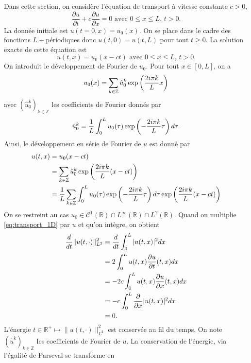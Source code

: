 Dans cette section, on considère l'équation de transport à vitesse constante $c>0$,
\begin{equation}
\dfrac{\partial u}{\partial t} + c \dfrac{\partial u}{\partial x} = 0 \text{ avec } 0 \leq x \leq L \text{, } t>0.
\label{eq:transport_1D}
\end{equation}
La donnée initiale est $u(t=0,x)=u_0(x)$. On se place dans le cadre des fonctions $L-$périodiques donc $u(t,0)=u(t,L)$ pour tout $t \geq 0$. La solution exacte de cette équation est
\begin{equation}
u(t,x) = u_0(x-ct)  \text{ avec } 0 \leq x \leq L \text{, } t>0.
\end{equation}
On introduit le développement de Fourier de $u_0$. Pour tout $x \in [0,L]$, on a
\begin{equation}
u_0(x) = \displaystyle\sum\limits_{k \in \mathbb{Z}} \hat{u}_0^k \exp \left( \dfrac{2i \pi k}{L} x \right)
\end{equation}
avec $(\hat{u}_0^k)_{k \in \mathbb{Z}}$ les coefficients de Fourier donnés par
\begin{equation}
\hat{u}_0^k = \dfrac{1}{L} \displaystyle\int_0^L u_0(\tau)  \exp \left( -\dfrac{2i \pi k}{L} \tau \right) d \tau.
\end{equation}
Ainsi, le développement en série de Fourier de $u$ est donné par
\begin{align}
u(t,x) & = u_0(x-ct)\\
	& = \displaystyle\sum\limits_{k \in \mathbb{Z}} \hat{u}_0^k \exp \left( \dfrac{2i \pi k}{L} (x-ct) \right) \\
	& = \dfrac{1}{L} \displaystyle\sum\limits_{k \in \mathbb{Z}} \displaystyle\int_0^L u_0(\tau)  \exp \left( -\dfrac{2i \pi k}{L} \tau \right) d \tau \exp \left( \dfrac{2i \pi k}{L} (x-ct) \right)
	\label{eq:trsp_fourier}
\end{align}
On se restreint au cas $u_0 \in \mathcal{C}^1(\mathbb{R}) \cap L^{\infty}(\mathbb{R}) \cap L^2(\mathbb{R})$. Quand on multiplie \eqref{eq:transport_1D} par $u$ et qu'on intègre, on obtient
\begin{align*}
\dfrac{d}{dt} \| u (t,\cdot) \|_{L^2}^2 & = \dfrac{d}{dt} \displaystyle\int_0^L |u(t,x)|^2 dx \\
	& = 2 \displaystyle\int_0^L u(t,x) \dfrac{\partial u}{\partial t}(t,x) dx \\
	& = - 2 c \displaystyle\int_0^L u(t,x) \dfrac{\partial u}{\partial x}(t,x) dx \\
	& = - c \displaystyle\int_0^L \dfrac{\partial}{\partial x} |u(t,x)|^2 dx \\
	& = 0.
\end{align*}
L'énergie $t \in \mathbb{R}^+ \mapsto  \| u (t,\cdot) \|_{L^2}^2$ est conservée au fil du temps. On note $(\hat{u}^k)_{k \in \mathbb{Z}}$ les coefficients de Fourier de $u$. La conservation de l'énergie, via l'égalité de Parseval se transforme en
